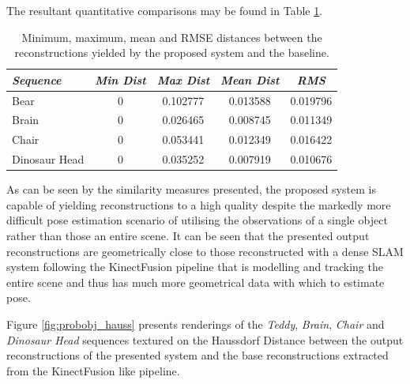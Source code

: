 The resultant quantitative comparisons may be found in Table \ref{tbl:probobj_hauss}.
\begin{table}[ht]
  \label{tbl:probobj_hauss}
  \centering
  \begin{tabular}{lcccc}
    \emph{Sequence} & \emph{Min Dist} & \emph{Max Dist} & \emph{Mean Dist} & \emph{RMS}\\
    \midrule
    \textsf{Bear} & 0 & 0.102777 & 0.013588 & 0.019796 \\
    \textsf{Brain} & 0 & 0.026465 & 0.008745 & 0.011349 \\
    \textsf{Chair} & 0 & 0.053441 & 0.012349 & 0.016422 \\
    \textsf{Dinosaur Head} & 0 & 0.035252 & 0.007919 & 0.010676
  \end{tabular}
  \caption[Probabilistic Object Reconstruction Hausdorff Distance]
  {Minimum, maximum, mean and RMSE distances between the reconstructions yielded by 
  the proposed system and the baseline.}
\end{table}

As can be seen by the similarity measures presented, the proposed system is capable of 
yielding reconstructions to a high quality despite the markedly more difficult pose estimation 
scenario of utilising the observations of a single object rather than those an entire scene. 
It can be seen that the presented output reconstructions are geometrically close to those 
reconstructed with a dense SLAM system \cite{Prisacariu2014} following the KinectFusion 
\cite{Newcombe2011} pipeline that is modelling and tracking the entire scene and thus has 
much more geometrical data with which to estimate pose.

Figure \ref{fig:probobj_hauss} presents renderings of the \textit{Teddy}, 
\textit{Brain}, \textit{Chair} and \textit{Dinosaur Head} sequences textured 
on the Haussdorf Distance between the output reconstructions of the presented 
system and the base reconstructions extracted from the KinectFusion like pipeline.

